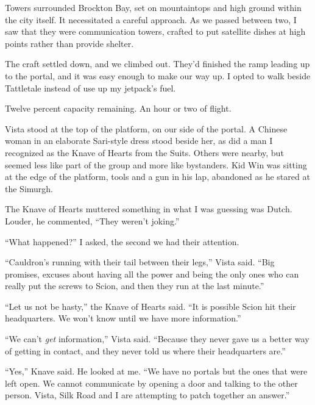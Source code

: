 Towers surrounded Brockton Bay, set on mountaintops and high ground within the city itself.  It necessitated a careful approach.  As we passed between two, I saw that they were communication towers, crafted to put satellite dishes at high points rather than provide shelter.



The craft settled down, and we climbed out.  They'd finished the ramp leading up to the portal, and it was easy enough to make our way up.  I opted to walk beside Tattletale instead of use up my jetpack's fuel.



Twelve percent capacity remaining.  An hour or two of flight.



Vista stood at the top of the platform, on our side of the portal.  A Chinese woman in an elaborate Sari-style dress stood beside her, as did a man I recognized as the Knave of Hearts from the Suits.  Others were nearby, but seemed less like part of the group and more like bystanders.  Kid Win was sitting at the edge of the platform, tools and a gun in his lap, abandoned as he stared at the Simurgh.



The Knave of Hearts muttered something in what I was guessing was Dutch.  Louder, he commented, ``They weren't joking.''



``What happened?''  I asked, the second we had their attention.



``Cauldron's running with their tail between their legs,'' Vista said.  ``Big promises, excuses about having all the power and being the only ones who can really put the screws to Scion, and then they run at the last minute.''



``Let us not be hasty,'' the Knave of Hearts said.  ``It is possible Scion hit their headquarters.  We won't know until we have more information.''



``We can't \emph{get }information,'' Vista said.  ``Because they never gave us a better way of getting in contact, and they never told us where their headquarters are.''



``Yes,'' Knave said.  He looked at me.  ``We have no portals but the ones that were left open.  We cannot communicate by opening a door and talking to the other person.  Vista, Silk Road and I are attempting to patch together an answer.''



